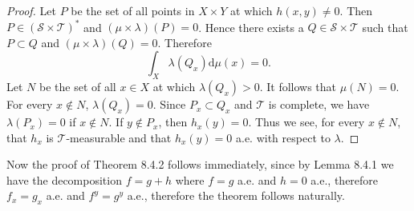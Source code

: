 \begin{proof}
Let $P$ be the set of all points in $X\times Y$ at which $h(x,y)\ne 0$. Then $P\in (\mathscr{S}\times\mathscr{T})^*$ and $(\mu\times\lambda)(P)=0$. Hence there exists a $Q\in\mathscr{S}\times\mathscr{T}$ such that $P\subset Q$ and $(\mu\times\lambda)(Q)=0$. Therefore 
$$\int_X\lambda(Q_x)\mathrm{d}\mu(x)=0.$$
Let $N$ be the set of all $x\in X$ at which $\lambda(Q_x)>0$. It follows that $\mu(N)=0$. For every $x\notin N$, $\lambda(Q_x)=0$. Since $P_x\subset Q_x$ and $\mathscr{T}$ is complete, we have $\lambda(P_x)=0$ if $x\notin N$. If $y\notin P_x$, then $h_x(y)=0$. Thus we see, for every $x\notin N$, that $h_x$ is $\mathscr{T}$-measurable and that $h_x(y)=0$ a.e. with respect to $\lambda$.
\end{proof}
Now the proof of Theorem 8.4.2 follows immediately, since by Lemma 8.4.1 we have the decomposition $f=g+h$ where $f=g$ a.e. and $h=0$ a.e., therefore $f_x=g_x$ a.e. and $f^y=g^y$ a.e., therefore the theorem follows naturally.
